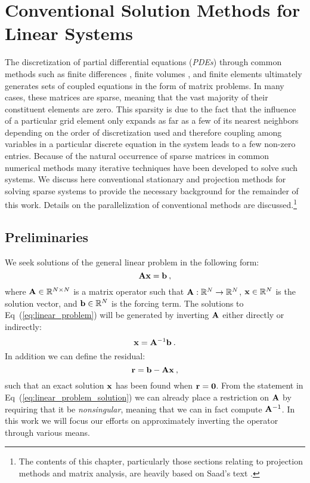 \chapter{Conventional Solution Methods for Linear Systems}
\label{ch:linear_problem}
The discretization of partial differential equations (\textit{PDEs})
through common methods such as finite differences
\citep{leveque_finite_2007}, finite volumes
\citep{leveque_finite_2002}, and finite elements
\citep{zienkiewicz_finite_2005} ultimately generates sets of coupled
equations in the form of matrix problems. In many cases, these
matrices are sparse, meaning that the vast majority of their
constituent elements are zero. This sparsity is due to the fact that
the influence of a particular grid element only expands as far as a
few of its nearest neighbors depending on the order of discretization
used and therefore coupling among variables in a particular discrete
equation in the system leads to a few non-zero entries. Because of the
natural occurrence of sparse matrices in common numerical methods many
iterative techniques have been developed to solve such systems. We
discuss here conventional stationary and projection methods for
solving sparse systems to provide the necessary background for the
remainder of this work. Details on the parallelization of conventional
methods are discussed.\footnote{The contents of this chapter,
  particularly those sections relating to projection methods and
  matrix analysis, are heavily based on Saad's text
  \citep{saad_iterative_2003}.}

\section{Preliminaries}
\label{sec:linear_preliminaries}
We seek solutions of the general linear problem in the following form:
\begin{equation}
  \mathbf{A} \mathbf{x} = \mathbf{b}\:,
  \label{eq:linear_problem}
\end{equation}
where $\mathbf{A} \in \mathbb{R}^{N \times N}$ is a matrix operator such
that $\mathbf{A} : \mathbb{R}^{N} \rightarrow \mathbb{R}^{N}$, $\mathbf{x} \in
\mathbb{R}^N$ is the solution vector, and $\mathbf{b} \in \mathbb{R}^N$ is
the forcing term. The solutions to Eq~(\ref{eq:linear_problem}) will
be generated by inverting $\mathbf{A}$ either directly or indirectly:
\begin{equation}
  \mathbf{x} = \mathbf{A}^{-1} \mathbf{b}
  \label{eq:linear_problem_solution}\:.
\end{equation}
In addition we can define the residual:
\begin{equation}
  \mathbf{r} = \mathbf{b} - \mathbf{A}\mathbf{x}\:,
  \label{eq:linear_residual}
\end{equation}
such that an exact solution $\mathbf{x}$ has been found when
$\mathbf{r}=\mathbf{0}$.  From the statement in
Eq~(\ref{eq:linear_problem_solution}) we can already place a
restriction on $\mathbf{A}$ by requiring that it be \textit{nonsingular},
  meaning that we can in fact compute $\mathbf{A}^{-1}$. In this work we
  will focus our efforts on approximately inverting the operator
  through various means.

